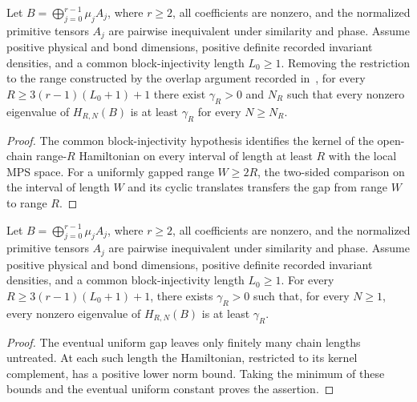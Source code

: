 \begin{lemma}
    \label{thm:primitive-block-parent-gap-three-block-bound}
    \leanok
    Let $B=\bigoplus_{j=0}^{r-1}\mu_j A_j$, where $r\geq2$, all coefficients
    are nonzero, and the normalized primitive tensors $A_j$ are pairwise
    inequivalent under similarity and phase. Assume positive physical and bond
    dimensions, positive definite recorded invariant densities, and a common
    block-injectivity length $L_0\geq1$. Removing the restriction to the
    range constructed by the overlap argument recorded
    in~\cite{gap:cpgsv21_block_parent_interaction_range}, for every
    $R\geq3(r-1)(L_0+1)+1$ there exist $\gamma_R>0$ and $N_R$ such that
    every nonzero eigenvalue of $H_{R,N}(B)$ is at least $\gamma_R$ for
    every $N\geq N_R$.
\end{lemma}
\begin{proof}\leanok
    The common block-injectivity hypothesis identifies the kernel of the
    open-chain range-$R$ Hamiltonian on every interval of length at least
    $R$ with the local MPS space. For a uniformly gapped range
    $W\geq2R$, the two-sided comparison on the interval of length $W$
    and its cyclic translates transfers the gap from range $W$ to range
    $R$.
\end{proof}

\begin{lemma}
    \label{thm:primitive-block-parent-uniform-gap-three-block-bound}
    \leanok
    Let $B=\bigoplus_{j=0}^{r-1}\mu_j A_j$, where $r\geq2$, all coefficients
    are nonzero, and the normalized primitive tensors $A_j$ are pairwise
    inequivalent under similarity and phase. Assume positive physical and bond
    dimensions, positive definite recorded invariant densities, and a common
    block-injectivity length $L_0\geq1$. For every
    $R\geq3(r-1)(L_0+1)+1$, there exists $\gamma_R>0$ such that, for every
    $N\geq1$, every nonzero eigenvalue of $H_{R,N}(B)$ is at least
    $\gamma_R$.
\end{lemma}
\begin{proof}\leanok
    The eventual uniform gap leaves only finitely many chain lengths untreated.
    At each such length the Hamiltonian, restricted to its kernel complement,
    has a positive lower norm bound. Taking the minimum of these bounds and the
    eventual uniform constant proves the assertion.
\end{proof}


